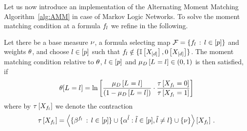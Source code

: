Let us now introduce an implementation of the Alternating Moment Matching Algorithm~\ref{alg:AMM} in case of Markov Logic Networks.
To solve the moment matching condition at a formula $f_{l}$ we refine  in the following.

\begin{lemma}
    \label{ref:lemMMinMLN}
    Let there be a base measure $\nu$, a formula selecting map $\mathcal{F}=\{f_{l} \, : \, l\in[p]\}$ and weights $\theta$, and choose $l\in[p]$ such that $f_{l}  \notin \{\mathbb{I}\left[X_{[d]}\right],0\left[X_{[d]}\right]\}$.
    The moment matching condition relative to $\theta$, $l\in[p]$ and $\mu_{D}\left[L_{}=l_{}\right]\in(0,1)$ is then satisfied, if
    \begin{align}
        \label{sol:momentMatchingExformula}
        \theta[L_{}=l_{}] = \ln \left[ 
            \frac{\mu_{D}\left[L_{}=l_{}\right]}{(1-\mu_{D}\left[L_{}=l_{}\right])}
            \cdot \frac{\tau\left[X_{f_{l} }=0\right]}{\tau\left[X_{f_{l} }=1\right]}
         \right]
    \end{align}
    where by $\tau\left[X_{f_{l} }\right]$ we denote the contraction
    \begin{align*}
        \tau\left[X_{f_{l}}\right]
        = \left\langle \{\beta^{f_{l}} \, : \, l\in[p]\}
        \cup\{\alpha^{\tilde{l}} : \tilde{l} \in [p], \tilde{l}\neq l\}
        \cup\{\nu\}\right\rangle \left[ X_{f_{l}} \right] \, .
    \end{align*}
\end{lemma}
